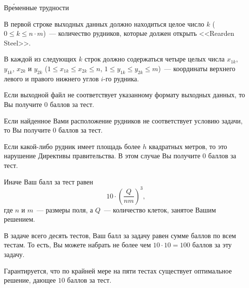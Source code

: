 \begin{problem}{Вр\'{е}менные трудности}{}{}{}{}
\OutputFile

В первой строке выходных данных должно находиться целое число $k$ ($0 \le k \le n\cdot m$)~--- количество рудников, которые должен открыть <<Rearden Steel>>.

В каждой из следующих $k$ строк должно содержаться четыре целых числа $x_{1k}$, $y_{1k}$, $x_{2k}$ и $y_{2k}$ ($1 \le x_{1k} \le x_{2k} \le n$, $1 \le y_{1k} \le y_{2k} \le m$)~--- координаты верхнего левого и правого нижнего углов $i$-го рудника.

\Examples

\begin{example}
%
\end{example}

\Scoring

Если выходной файл не соответствует указанному формату выходных данных, то Вы получите $0$ баллов за тест.

Если найденное Вами расположение рудников не соответствует условию задачи, то Вы получите $0$ баллов за тест.

Если какой-либо рудник имеет площадь более $h$ квадратных метров, то это нарушение Директивы правительства. В этом случае Вы получите $0$ баллов за тест.

Иначе Ваш балл за тест равен \[10\cdot\left(\frac{Q}{nm}\right)^3,\] где $n$ и $m$~--- размеры поля, а $Q$~--- количество клеток, занятое Вашим решением.

В задаче всего десять тестов, Ваш балл за задачу равен сумме баллов по всем тестам. То есть, Вы можете набрать не более чем $10\cdot10 = 100$ баллов за эту задачу.

Гарантируется, что по крайней мере на пяти тестах существует оптимальное решение, дающее $10$ баллов за тест.

\end{problem}

